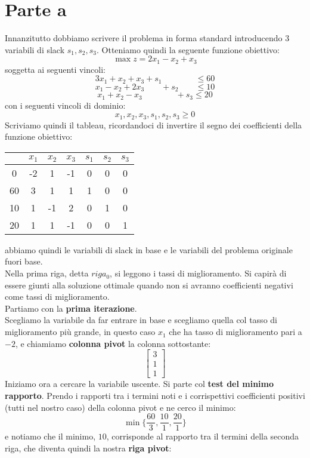 \documentclass[a4paper,12pt, oneside]{book}
\begin{document}
\section{Parte a}
Innanzitutto dobbiamo scrivere il problema in forma standard
introducendo 3 variabili di slack $s_1, s_2, s_3$. Otteniamo quindi la
seguente funzione obiettivo:
\[\max z=2x_1-x_2+x_3\]
soggetta ai seguenti vincoli:
\[3x_1+x_2+x_3+s_1\qquad\qquad\leq 60\]
\[x_1-x_2+2x_3\qquad+ s_2\qquad\leq 10\]
\[x_1+x_2-x_3 \qquad\qquad+s_3\leq 20\]
con i seguenti vincoli di dominio:
\[x_1,x_2,x_3,s_1,s_2,s_3\geq 0\]
Scriviamo quindi il tableau, ricordandoci di invertire il segno dei
coefficienti della funzione obiettivo:
\begin{center}
  \begin{tabular}{c|cccccc}
    & $x_1$ & $x_2$ & $x_3$ & $s_1$ & $s_2$ & $s_3$\\
    \hline
    0 & -2 & 1 & -1 & 0 & 0 & 0\\
    \hline
    60 & 3 & 1 & 1 & 1 & 0 & 0\\
    10 & 1 & -1 & 2 & 0 & 1 & 0\\
    20 & 1 & 1 & -1 & 0 & 0 & 1
  \end{tabular}
\end{center}
abbiamo quindi le variabili di slack in base e le variabili del
problema originale fuori base.\\
Nella prima riga, detta $riga_0$, si leggono i tassi di miglioramento.
Si capirà di essere giunti alla soluzione ottimale quando non si avranno
coefficienti negativi come tassi di miglioramento.\\
Partiamo con la \textbf{prima iterazione}.\\
Scegliamo la variabile da far entrare in base e scegliamo quella col
tasso di miglioramento più grande, in questo caso $x_1$ che ha tasso
di miglioramento pari a $-2$, e chiamiamo \textbf{colonna pivot}
la colonna sottostante:
\[
  \left[\begin{matrix}
    3\\
    1\\
    1
  \end{matrix}\right]
\]
Iniziamo ora a cercare la variabile uscente. Si parte col \textbf{test
  del minimo rapporto}. Prendo i rapporti tra i termini noti e i
corrispettivi coefficienti positivi (tutti nel nostro caso) della
colonna pivot e ne cerco il minimo:
\[\min\Bigg\{\frac{60}{3}, \frac{10}{1},\frac{20}{1}\Bigg\}\]
e notiamo che il minimo, $10$, corrisponde al rapporto tra il termini
della seconda riga, che diventa quindi la nostra \textbf{riga pivot}:
\end{document}
